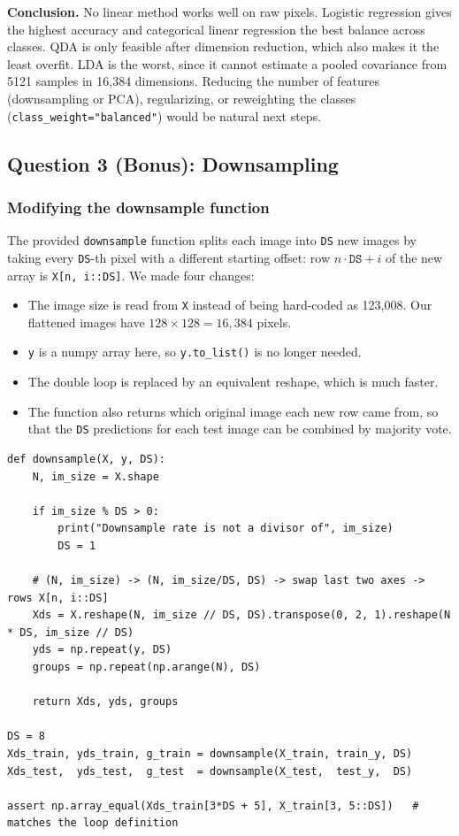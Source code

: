 \documentclass[11pt]{article}
\begin{document}
\textbf{Conclusion.} No linear method works well on raw pixels. Logistic regression gives
the highest accuracy and categorical linear regression the best balance across classes. QDA
is only feasible after dimension reduction, which also makes it the least overfit. LDA is
the worst, since it cannot estimate a pooled covariance from 5121 samples in 16{,}384
dimensions. Reducing the number of features (downsampling or PCA), regularizing, or
reweighting the classes (\texttt{class\_weight="balanced"}) would be natural next steps.

\clearpage
\subsection*{Question 3 (Bonus): Downsampling}

\subsubsection*{Modifying the downsample function}

The provided \texttt{downsample} function splits each image into \texttt{DS} new images by
taking every \texttt{DS}-th pixel with a different starting offset:
row $n \cdot \texttt{DS} + i$ of the new array is \texttt{X[n, i::DS]}. We made four changes:
\begin{itemize}
  \item The image size is read from \texttt{X} instead of being hard-coded as 123{,}008.
  Our flattened images have $128 \times 128 = 16{,}384$ pixels.
  \item \texttt{y} is a numpy array here, so \texttt{y.to\_list()} is no longer needed.
  \item The double loop is replaced by an equivalent reshape, which is much faster.
  \item The function also returns which original image each new row came from, so that the
  \texttt{DS} predictions for each test image can be combined by majority vote.
\end{itemize}

\begin{lstlisting}
def downsample(X, y, DS):
    N, im_size = X.shape

    if im_size % DS > 0:
        print("Downsample rate is not a divisor of", im_size)
        DS = 1

    # (N, im_size) -> (N, im_size/DS, DS) -> swap last two axes -> rows X[n, i::DS]
    Xds = X.reshape(N, im_size // DS, DS).transpose(0, 2, 1).reshape(N * DS, im_size // DS)
    yds = np.repeat(y, DS)
    groups = np.repeat(np.arange(N), DS)

    return Xds, yds, groups

DS = 8
Xds_train, yds_train, g_train = downsample(X_train, train_y, DS)
Xds_test,  yds_test,  g_test  = downsample(X_test,  test_y,  DS)

assert np.array_equal(Xds_train[3*DS + 5], X_train[3, 5::DS])   # matches the loop definition
\end{lstlisting}
\end{document}

